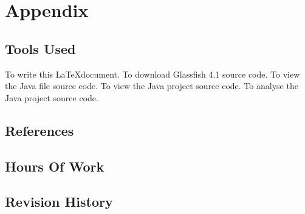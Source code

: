 \section{Appendix}

\subsection{Tools Used}
\begin{enumerate}
	 To write this \LaTeX document.
	 To download Glassfish 4.1 source code.
	 To view the Java file source code.
	 To view the Java project source code.
	 To analyse the Java project source code.
\end{enumerate}

\subsection{References}

\subsection{Hours Of Work}

\subsection{Revision History}

